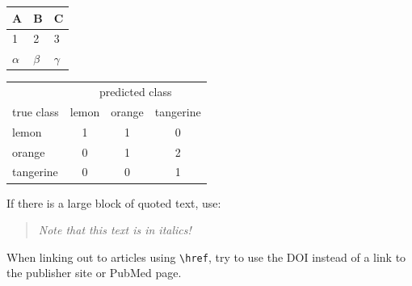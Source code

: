\documentclass[letterpaper, 12pt]{article}
\begin{document}
\pagebreak

\begin{center}
\begin{tabular}{|p{3.0cm}|p{3.0cm}|p{3.0cm}|}
\hline
     A & B & C\\ \hline\hline
     1 & 2 & 3\\\hline
     $\alpha$ & $\beta$ & $\gamma$\\ \hline
\end{tabular}
\end{center}

\begin{center}
\begin{tabular}{l|ccc}
& \multicolumn{3}{c}{predicted class} \\
true class & lemon & orange & tangerine \\
\hline
lemon & 1 & 1 & 0\\
orange & 0 & 1 & 2\\
tangerine & 0 & 0 & 1\\
\end{tabular}
\end{center}

If there is a large block of quoted text, use:

\begin{quote}
    \textit{Note that this text is in italics!}
\end{quote}

When linking out to articles using \verb|\href|, try to use the DOI instead of a link to the publisher site or PubMed page.
\end{document}
